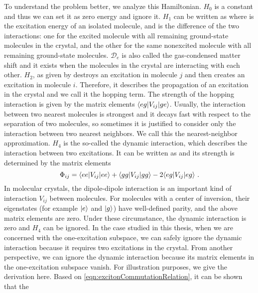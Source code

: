 To understand the problem better, we analyze this Hamiltonian. 
$H_0$ is a constant and thus we can set it as zero energy and ignore it. $H_1$ can be written as 
where  
 is the excitation energy of an isolated molecule, and
is the difference of the two interactions: one for the excited molecule with all remaining ground-state  
molecules  in the crystal, and the other  for  the same nonexcited molecule with all remaining ground-state 
molecules. $\mathscr{D}_e$ is also called the gas-condensed matter shift and it exists when the molecules in the crystal
are interacting with each other.  $H_2$,  as given by
destroys an excitation in molecule $j$ and then creates an excitation in molecule $i$. Therefore, it describes the 
propagation of an excitation in the crystal and we call it the hopping term. The strength of the hopping interaction 
is given by the matrix elements $\langle eg | V_{ij}  | ge \rangle$. Usually, the interaction between two nearest 
molecules is strongest and it decays fast with respect to the separation of two molecules, so sometimes it is justified
to consider only the interaction between two nearest neighbors. We call this the nearest-neighbor approximation.  
$H_4$ is the so-called the dynamic interaction, which describes the interaction between two excitations. It can be written as
and its strength
is determined by the matrix elements
\[
\Phi_{ij}  = \matelement{ee}{V_{ij} }{ee} + \matelement{gg}{V_{ij} }{gg} - 2 \matelement{eg}{V_{ij} }{eg} \ .
\]
In molecular crystals, the dipole-dipole interaction is an important kind of interaction $V_{ij}$ between molecules. For 
molecules with a center of inversion, their eigenstates (for example $| e \rangle$ and $| g \rangle$) have well-defined
parity, and the above matrix elements are zero. Under these circumstance, the dynamic interaction is zero and $H_4$ can 
be ignored. In the case studied in this thesis, when we are concerned with the one-excitation subspace, we can safely ignore the 
dynamic interaction because it requires two excitations in the crystal. From another perspective, we can ignore the 
dynamic interaction because its matrix elements in the one-excitation subspace vanish. For illustration purposes, we give the derivation here. Based on \autoref{eqn:excitonCommutationRelation}, it can be shown that the

